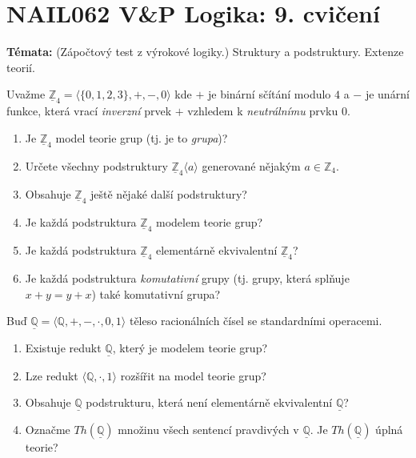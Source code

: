 \documentclass[a4paper,12pt]{article}
\begin{document}
\section*{NAIL062 V\&P Logika: 9. cvičení}


\textbf{Témata:}
(Zápočtový test z výrokové logiky.) Struktury a podstruktury. Extenze teorií.


\medskip\begin{problem}
    Uvažme $\underline{\mathbb{Z}}_4=\langle\{0,1,2,3\},+,-,0 \rangle$ kde $+$ je binární sčítání modulo $4$ a $-$ je unární funkce, která vrací \emph{inverzní} prvek $+$ vzhledem k \emph{neutrálnímu} prvku $0$.
    \begin{enumerate}        
        \item Je $\underline{\mathbb{Z}}_4$ model teorie grup (tj. je to \emph{grupa})?
        \item Určete všechny podstruktury $\underline{\mathbb{Z}}_4\langle a\rangle$ generované nějakým $a\in \mathbb{Z}_4$.
        \item Obsahuje $\underline{\mathbb{Z}}_4$ ještě nějaké další podstruktury?
        \item Je každá podstruktura $\underline{\mathbb{Z}}_4$ modelem teorie grup?
        \item Je každá podstruktura $\underline{\mathbb{Z}}_4$ elementárně ekvivalentní $\underline{\mathbb{Z}}_4$?
        \item Je každá podstruktura \emph{komutativní} grupy (tj. grupy, která splňuje $x+y=y+x$) také komutativní grupa?
    \end{enumerate}
\end{problem}
 
        
\medskip\begin{problem}
    Buď $\underline{\mathbb{Q}}=\langle\mathbb{Q},+,-,\cdot,0,1 \rangle$ těleso racionálních čísel se standardními operacemi.
    \begin{enumerate}                
        \item Existuje redukt $\underline{\mathbb{Q}}$, který je modelem teorie grup?
        \item Lze redukt $\langle\mathbb{Q},\cdot,1\rangle$ rozšířit na model teorie grup?
        \item Obsahuje $\underline{\mathbb{Q}}$ podstrukturu, která není elementárně ekvivalentní $\underline{\mathbb{Q}}$?
        \item Označme $Th(\underline{\mathbb{Q}})$ množinu všech sentencí pravdivých v $\underline{\mathbb{Q}}$. Je $Th(\underline{\mathbb{Q}})$ úplná teorie?
    \end{enumerate}
\end{problem}
    
\end{document}
